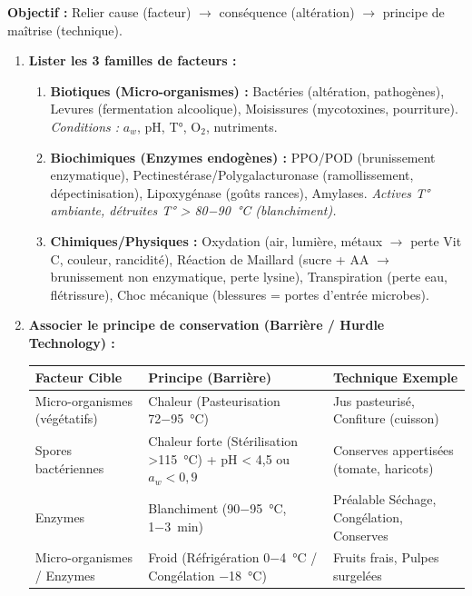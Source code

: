 \documentclass[11pt]{article}
\begin{document}
\begin{methode}
    \textbf{Objectif :} Relier cause (facteur) $\rightarrow$ conséquence (altération) $\rightarrow$ principe de maîtrise (technique).
    \begin{enumerate}
        \item \textbf{Lister les 3 familles de facteurs :}
            \begin{enumerate}
                \item \textbf{Biotiques (Micro-organismes) :} Bactéries (altération, pathogènes), Levures (fermentation alcoolique), Moisissures (mycotoxines, pourriture). \emph{Conditions :} $a_w$, pH, T°, O$_2$, nutriments.
                \item \textbf{Biochimiques (Enzymes endogènes) :} PPO/POD (brunissement enzymatique), Pectinestérase/Polygalacturonase (ramollissement, dépectinisation), Lipoxygénase (goûts rances), Amylases. \emph{Actives T° ambiante, détruites T° > \SI{80-90}{\celsius} (blanchiment).}
                \item \textbf{Chimiques/Physiques :} Oxydation (air, lumière, métaux $\rightarrow$ perte Vit C, couleur, rancidité), Réaction de Maillard (sucre + AA $\rightarrow$ brunissement non enzymatique, perte lysine), Transpiration (perte eau, flétrissure), Choc mécanique (blessures = portes d'entrée microbes).
            \end{enumerate}
        \item \textbf{Associer le principe de conservation (Barrière / Hurdle Technology) :}
            \begin{center}
                \begin{tabular}{|l|l|l|}\hline
                \textbf{Facteur Cible} & \textbf{Principe (Barrière)} & \textbf{Technique Exemple} \\ \hline
                Micro-organismes (végétatifs) & Chaleur (Pasteurisation \SI{72-95}{\celsius}) & Jus pasteurisé, Confiture (cuisson) \\ \hline
                Spores bactériennes & Chaleur forte (Stérilisation \SI{>115}{\celsius}) + pH < 4,5 ou $a_w < 0,9$ & Conserves appertisées (tomate, haricots) \\ \hline
                Enzymes & Blanchiment (\SI{90-95}{\celsius}, \SI{1-3}{min}) & Préalable Séchage, Congélation, Conserves \\ \hline
                Micro-organismes / Enzymes & Froid (Réfrigération \SI{0-4}{\celsius} / Congélation \SI{-18}{\celsius}) & Fruits frais, Pulpes surgelées \\ \hline

\end{tabular}
\end{center}
\end{enumerate}
\end{methode}
\end{document}
